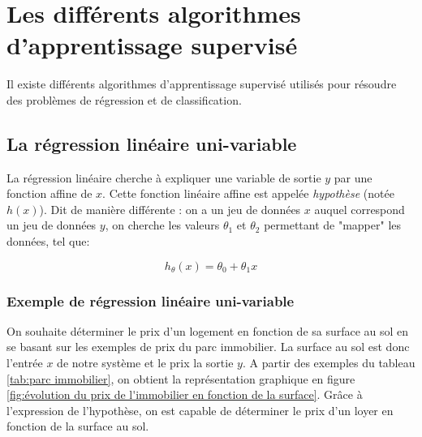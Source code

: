 \section{Les différents algorithmes d'apprentissage supervisé}
\label{Le Machine Learning:Les différents algorithmes d'apprentissage supervisé}
Il existe différents algorithmes d'apprentissage supervisé utilisés pour résoudre des problèmes de régression et de classification. 


\subsection{La régression linéaire uni-variable}
\label{Le Machine Learning:Les différents algorithmes d'apprentissage supervisé: La regression linéaire}
La régression linéaire cherche à expliquer une variable de sortie $y$ par une fonction affine de $x$. Cette fonction linéaire affine est appelée \emph{hypothèse} (notée $h(x)$). Dit de manière différente : on a un jeu de données $x$ auquel correspond un jeu de données $y$, on cherche les valeurs $\theta_1$ et $\theta_2$ permettant de "mapper" les données, tel que:

\begin{equation}
	h_\theta (x) = \theta_0 + \theta_1 x
\end{equation}


\subsubsection{Exemple de régression linéaire uni-variable}
\label{Le Machine Learning:Les différents algorithmes d'apprentissage supervisé: La regression linéaire: Exemple de régression linéaire uni-variable}
On souhaite déterminer le prix d'un logement en fonction de sa surface au sol en se basant sur les exemples de prix du parc immobilier. 
La surface au sol est donc l'entrée $x$ de notre système et le prix la sortie $y$. A partir des exemples du tableau \ref {tab:parc immobilier}, on obtient la représentation graphique en figure \ref{fig:évolution du prix de l'immobilier en fonction de la surface}. Grâce à l'expression de l'hypothèse, on est capable de déterminer le prix d'un loyer en fonction de la surface au sol.  

